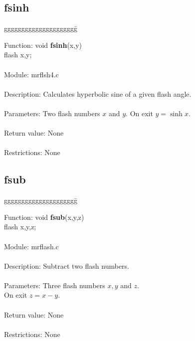 \subsection{fsinh}

\begin{tabbing}
ggggggggggggggggggggg\= \kill

      Function:      \>void {\bf fsinh}(x,y) \\
                     \>flash x,y; \\
      \ \\
      Module:        \>mrflsh4.c \\
      \ \\
      Description:   \>Calculates hyperbolic sine of a given flash angle. \\
      \ \\
      Parameters:    \>Two flash numbers $x$ and $y$. On exit $y=\sinh x $. \\
      \ \\
      Return value:  \>None \\
      \ \\
      Restrictions:  \>None \\

\end{tabbing}
\pagebreak
\subsection{fsub}

\begin{tabbing}
ggggggggggggggggggggg\= \kill

      Function:      \>void {\bf fsub}(x,y,z) \\
                     \>flash x,y,z; \\
      \ \\
      Module:        \>mrflash.c \\
      \ \\
      Description:   \>Subtract two flash numbers. \\
      \ \\
      Parameters:    \>Three flash numbers $x,y$ and $z$. \\
                     \>On exit $z=x-y$. \\
      \ \\
      Return value:  \>None \\
      \ \\
      Restrictions:  \>None \\
      
\end{tabbing}

